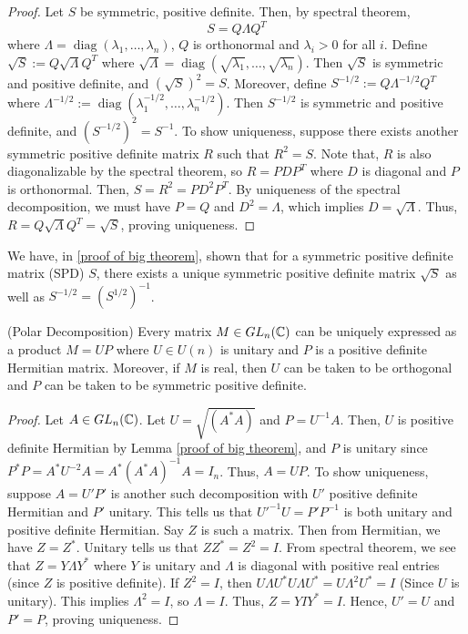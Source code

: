 \documentclass[main.tex]{subfiles}
\begin{document}
\begin{proof}
    Let $S$ be symmetric, positive definite. Then, by spectral theorem, $$S=Q \Lambda Q^T$$ where $\Lambda=\operatorname{diag}(\lambda_1,\ldots,\lambda_n)$, $Q$ is orthonormal and $\lambda_i > 0$ for all $i$. Define $\sqrt{S} := Q \sqrt{\Lambda} Q^T$ where $\sqrt{\Lambda} = \operatorname{diag}(\sqrt{\lambda_1},\ldots,\sqrt{\lambda_n})$. Then $\sqrt{S}$ is symmetric and positive definite, and $(\sqrt{S})^2 = S$.
\newline
Moreover, define $S^{-1/2} := Q \Lambda^{-1/2} Q^T$ where $\Lambda^{-1/2}:=\operatorname{diag}(\lambda_1^{-1/2},\ldots,\lambda_n^{-1/2})$. Then $S^{-1/2}$ is symmetric and positive definite, and $(S^{-1/2})^2 = S^{-1}$.
\newline
To show uniqueness, suppose there exists another symmetric positive definite matrix $R$ such that $R^2 = S$. Note that, $R$ is also diagonalizable by the spectral theorem, so $R = P D P^T$ where $D$ is diagonal and $P$ is orthonormal. Then, $S = R^2 = P D^2 P^T$. By uniqueness of the spectral decomposition, we must have $P = Q$ and $D^2 = \Lambda$, which implies $D = \sqrt{\Lambda}$. Thus, $R = Q \sqrt{\Lambda} Q^T = \sqrt{S}$, proving uniqueness. 
\end{proof}
\begin{remark}
    We have, in \ref{proof of big theorem}, shown that for a symmetric positive definite matrix (SPD) $S$, there exists a unique symmetric positive definite matrix $\sqrt{S}$ as well as $S^{-1/2}=(S^{1/2})^{-1}$. 
\end{remark}

\begin{theorem}\label{polar decomposition}
    (Polar Decomposition) Every matrix $M \in GL_n(\mathbb C)$ can be uniquely expressed as a product $M = UP$ where $U \in U(n)$ is unitary and $P$ is a positive definite Hermitian matrix. Moreover, if $M$ is real, then $U$ can be taken to be orthogonal and $P$ can be taken to be symmetric positive definite.
\end{theorem}
\begin{proof}
Let $A \in GL_n(\mathbb C)$. Let $U=\sqrt{(A^*A)}$ and $P = U^{-1}A$. Then, $U$ is positive definite Hermitian by Lemma \ref{proof of big theorem}, and $P$ is unitary since $P^*P = A^*U^{-2}A = A^*(A^*A)^{-1}A = I_n$. Thus, $A = UP$.
To show uniqueness, suppose $A = U'P'$ is another such decomposition with $U'$ positive definite Hermitian and $P'$ unitary. This tells us that $U'^{-1}U=P'P^{-1}$ is both unitary and positive definite Hermitian. Say $Z$ is such a matrix. Then from Hermitian, we have $Z=Z^*$. Unitary tells us that $ZZ^*=Z^2=I$. From spectral theorem, we see that $Z=Y \Lambda Y^*$ where $Y$ is unitary and $\Lambda$ is diagonal with positive real entries (since $Z$ is positive definite). If $Z^2=I$, then $U \Lambda U^* U \Lambda U^*=U \Lambda^2 U^*=I$ (Since $U$ is unitary). This implies $\Lambda^2=I$, so $\Lambda=I$. Thus, $Z=Y I Y^* = I$. Hence, $U'=U$ and $P'=P$, proving uniqueness.

\end{proof}
\end{document}
